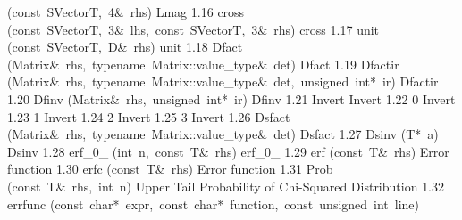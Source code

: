 \documentclass{article}
\begin{document}
\begin{cxxentry}
\begin{cxxnames}
        {(const\ SVector\<T,\ 4\>\&\ rhs)}
        {Lmag}
        {1.16}
        {cross}
        {(const\ SVector\<T,\ 3\>\&\ lhs,\ const\ SVector\<T,\ 3\>\&\ rhs)}
        {cross}
        {1.17}
        {unit}
        {(const\ SVector\<T,\ D\>\&\ rhs)}
        {unit}
        {1.18}
        {Dfact}
        {(Matrix\&\ rhs,\ typename\ Matrix::value\_type\&\ det)}
        {Dfact}
        {1.19}
        {Dfactir}
        {(Matrix\&\ rhs,\ typename\ Matrix::value\_type\&\ det,\ unsigned\ int*\ ir)}
        {Dfactir}
        {1.20}
        {Dfinv}
        {(Matrix\&\ rhs,\ unsigned\ int*\ ir)}
        {Dfinv}
        {1.21}
        {Invert}
        {}
        {Invert}
        {1.22}
        {0}
        {}
        {Invert\>}
        {1.23}
        {1}
        {}
        {Invert\>}
        {1.24}
        {2}
        {}
        {Invert\>}
        {1.25}
        {3}
        {}
        {Invert\>}
        {1.26}
        {Dsfact}
        {(Matrix\&\ rhs,\ typename\ Matrix::value\_type\&\ det)}
        {Dsfact}
        {1.27}
        {Dsinv}
        {(T*\ a)}
        {Dsinv}
        {1.28}
        {erf\_0\_}
        {(int\ n,\ const\ T\&\ rhs)}
        {erf\_0\_}
        {1.29}
        {erf}
        {(const\ T\&\ rhs)}
        {Error function}
        {1.30}
        {erfc}
        {(const\ T\&\ rhs)}
        {Error function}
        {1.31}
        {Prob}
        {(const\ T\&\ rhs,\ int\ n)}
        {Upper Tail Probability of Chi-Squared Distribution}
        {1.32}
        {errfunc}
        {(const\ char*\ expr,\ const\ char*\ function,\ const\ unsigned\ int\ line)}

\end{cxxnames}
\end{cxxentry}
\end{document}
